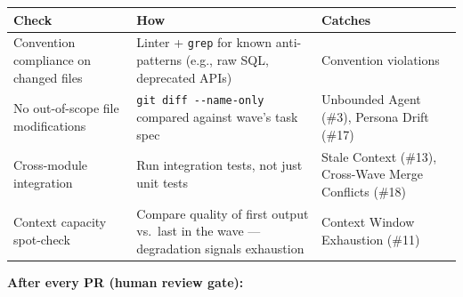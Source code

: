 \documentclass[
  a4paper,
  DIV=11,
  numbers=noendperiod]{scrreprt}
\newcounter{none} %
\begin{document}
{\def\LTcaptype{none} %
\begin{longtable}[]{@{}
  >{\raggedright\arraybackslash}p{}
  >{\raggedright\arraybackslash}p{}
  >{\raggedright\arraybackslash}p{}@{}}
\toprule\noalign{}
\begin{minipage}[b]{\linewidth}\raggedright
Check
\end{minipage} & \begin{minipage}[b]{\linewidth}\raggedright
How
\end{minipage} & \begin{minipage}[b]{\linewidth}\raggedright
Catches
\end{minipage} \\
\midrule\noalign{}
\endhead
\bottomrule\noalign{}
\endlastfoot
Convention compliance on changed files & Linter + \texttt{grep} for
known anti-patterns (e.g., raw SQL, deprecated APIs) & Convention
violations \\
No out-of-scope file modifications & \texttt{git\ diff\ -\/-name-only}
compared against wave's task spec & Unbounded Agent (\#3), Persona Drift
(\#17) \\
Cross-module integration & Run integration tests, not just unit tests &
Stale Context (\#13), Cross-Wave Merge Conflicts (\#18) \\
Context capacity spot-check & Compare quality of first output vs.~last
in the wave --- degradation signals exhaustion & Context Window
Exhaustion (\#11) \\
\end{longtable}
}

\textbf{After every PR (human review gate):}
\end{document}
